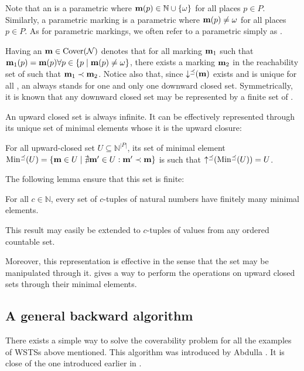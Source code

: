 Note that an \omark \mar is a parametric \omark where $\mathbf{m}(p) \in \mathbb{N} \cup \{\omega\}$ for all places $p \in P$.
Similarly, a parametric marking \mar is a parametric \omark where $\mathbf{m}(p) \neq \omega$ for all places $p \in P$.
As for parametric markings, we often refer to a parametric \omark simply as \omark.

Having an \omark $\mathbf{m} \in \operatorname{Cover}(\mathcal{N})$ denotes that for all marking $\mathbf{m}_1$ such that $\mathbf{m}_1(p) = \mathbf{m}(p) \forall p \in \{p \mid \mathbf{m}(p) \neq \omega\}$, there exists a marking $\mathbf{m}_2$ in the reachability set of \N such that $\mathbf{m}_1 \prec \mathbf{m}_2$.
Notice also that, since $\operatorname{\downarrow^\preceq}(\mathbf{m})$ exists and is unique for all \omark \mar, an \omark always stands for one and only one downward closed set.
Symmetrically, it is known that any downward closed set may be represented by a finite set of \omarks \citep{Geeraerts06}. 

An upward closed set is always infinite.
It can be effectively represented through its unique set of minimal elements whose it is the upward closure:
\begin{lemm}
  For all upward-closed set $U \subseteq \mathbb{N}^{|P|}$, its set of minimal element $\operatorname{Min^\preceq}(U) = \{\mathbf{m} \in U \mid \nexists \mathbf{m'} \in U : \mathbf{m'} \prec \mathbf{m}\}$ is such that $\operatorname{\uparrow^\preceq}(\operatorname{Min^\preceq}(U)) = U$.
\end{lemm}

The following lemma ensure that this set is finite:
\begin{lemm}
  For all $c \in \mathbb{N}$, every set of $c$-tuples of natural numbers have finitely many minimal elements.
\end{lemm}
This result may easily be extended to $c$-tuples of values from any ordered countable set.

Moreover, this representation is effective in the sense that the set may be manipulated through it.
\cite{Ganty09} gives a way to perform the operations on upward closed sets through their minimal elements.

\subsection{A general backward algorithm}

There exists a simple way to solve the coverability problem for all the examples of \acp{WSTS} above mentioned.
This algorithm was introduced by Abdulla  \citep{Abdulla96}.
It is close of the one introduced earlier in \cite{Finkel90}.


